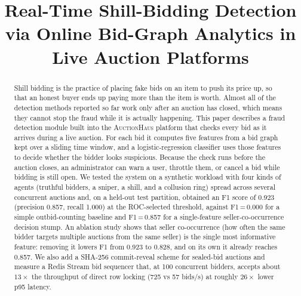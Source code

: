\documentclass[conference]{IEEEtran}
\begin{document}
\title{Real-Time Shill-Bidding Detection via Online Bid-Graph Analytics
in Live Auction Platforms}

\author{
}

\maketitle

\begin{abstract}
Shill bidding is the practice of placing fake bids on an item to push
its price up, so that an honest buyer ends up paying more than the item
is worth. Almost all of the detection methods reported so far work only
after an auction has closed, which means they cannot stop the fraud while
it is actually happening. This paper describes a fraud detection module
built into the \textsc{AuctionHaus} platform that checks every bid as it
arrives during a live auction. For each bid it computes five features
from a bid graph kept over a sliding time window, and a
logistic-regression classifier uses those features to decide whether the
bidder looks suspicious. Because the check runs before the auction
closes, an administrator can warn a user, throttle them, or cancel a bid
while bidding is still open. We tested the system on a synthetic workload
with four kinds of agents (truthful bidders, a sniper, a shill, and a
collusion ring) spread across several concurrent auctions and, on a
held-out test partition, obtained an F1 score of 0.923 (precision 0.857,
recall 1.000) at the ROC-selected threshold, against F1\,=\,0.000 for a
simple outbid-counting baseline and F1\,=\,0.857 for a single-feature
seller-co-occurrence decision stump. An ablation study shows that seller
co-occurrence (how often the same bidder targets multiple auctions from
the same seller) is the single most informative feature: removing it
lowers F1 from 0.923 to 0.828, and on its own it already reaches 0.857. We also add a SHA-256
commit-reveal scheme for sealed-bid auctions and measure a Redis Stream
bid sequencer that, at 100 concurrent bidders, accepts about $13\times$
the throughput of direct row locking (725 vs 57 bids/s) at roughly
$26\times$ lower p95 latency.
\end{abstract}
\end{document}
